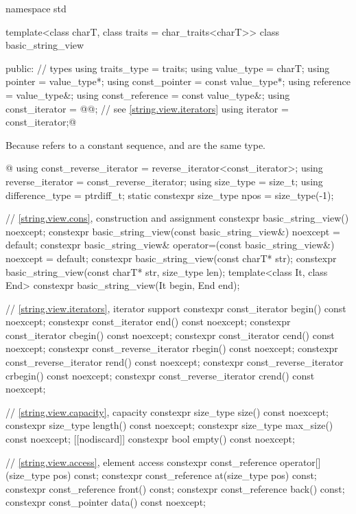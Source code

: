 \begin{codeblock}
namespace std {
  template<class charT, class traits = char_traits<charT>>
  class basic_string_view {
  public:
    // types
    using traits_type            = traits;
    using value_type             = charT;
    using pointer                = value_type*;
    using const_pointer          = const value_type*;
    using reference              = value_type&;
    using const_reference        = const value_type&;
    using const_iterator         = @@; // see \ref{string.view.iterators}
    using iterator               = const_iterator;@
\begin{footnote}
Because  refers to a constant sequence,  and  are the same type.
\end{footnote}@
    using const_reverse_iterator = reverse_iterator<const_iterator>;
    using reverse_iterator       = const_reverse_iterator;
    using size_type              = size_t;
    using difference_type        = ptrdiff_t;
    static constexpr size_type npos = size_type(-1);

    // \ref{string.view.cons}, construction and assignment
    constexpr basic_string_view() noexcept;
    constexpr basic_string_view(const basic_string_view&) noexcept = default;
    constexpr basic_string_view& operator=(const basic_string_view&) noexcept = default;
    constexpr basic_string_view(const charT* str);
    constexpr basic_string_view(const charT* str, size_type len);
    template<class It, class End>
      constexpr basic_string_view(It begin, End end);

    // \ref{string.view.iterators}, iterator support
    constexpr const_iterator begin() const noexcept;
    constexpr const_iterator end() const noexcept;
    constexpr const_iterator cbegin() const noexcept;
    constexpr const_iterator cend() const noexcept;
    constexpr const_reverse_iterator rbegin() const noexcept;
    constexpr const_reverse_iterator rend() const noexcept;
    constexpr const_reverse_iterator crbegin() const noexcept;
    constexpr const_reverse_iterator crend() const noexcept;

    // \ref{string.view.capacity}, capacity
    constexpr size_type size() const noexcept;
    constexpr size_type length() const noexcept;
    constexpr size_type max_size() const noexcept;
    [[nodiscard]] constexpr bool empty() const noexcept;

    // \ref{string.view.access}, element access
    constexpr const_reference operator[](size_type pos) const;
    constexpr const_reference at(size_type pos) const;
    constexpr const_reference front() const;
    constexpr const_reference back() const;
    constexpr const_pointer data() const noexcept;

}}
\end{codeblock}
